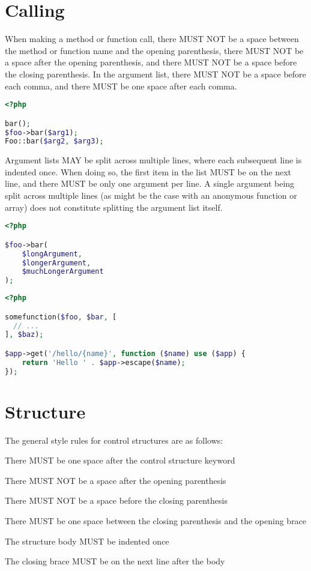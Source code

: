 \section{Calling}

When making a method or function call, there MUST NOT be a space between the method or function name and the opening parenthesis, there MUST NOT be a space after the opening parenthesis, and there MUST NOT be a space before the closing parenthesis. In the argument list, there MUST NOT be a space before each comma, and there MUST be one space after each comma.



\begin{lstlisting}[language=PHP]
<?php

bar();
$foo->bar($arg1);
Foo::bar($arg2, $arg3);
\end{lstlisting}



Argument lists MAY be split across multiple lines, where each subsequent line is indented once. When doing so, the first item in the list MUST be on the next line, and there MUST be only one argument per line. A single argument being split across multiple lines (as might be the case with an anonymous function or array) does not constitute splitting the argument list itself.




\begin{lstlisting}[language=PHP]
<?php

$foo->bar(
    $longArgument,
    $longerArgument,
    $muchLongerArgument
);
\end{lstlisting}






\begin{lstlisting}[language=PHP]
<?php

somefunction($foo, $bar, [
  // ...
], $baz);

$app->get('/hello/{name}', function ($name) use ($app) {
    return 'Hello ' . $app->escape($name);
});
\end{lstlisting}

\section{Structure}

The general style rules for control structures are as follows:

\begin{compactitem}
\item There MUST be one space after the control structure keyword
\item There MUST NOT be a space after the opening parenthesis
\item There MUST NOT be a space before the closing parenthesis
\item There MUST be one space between the closing parenthesis and the opening brace
\item The structure body MUST be indented once
\item The closing brace MUST be on the next line after the body
\end{compactitem}

